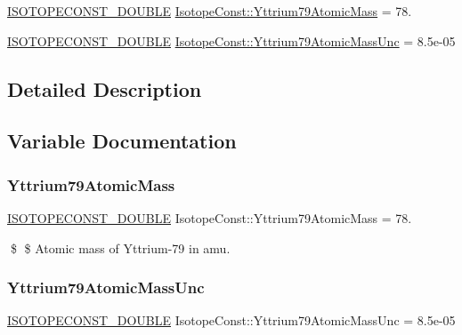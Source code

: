\begin{DoxyCompactItemize}
\item 
\mbox{\hyperlink{group___isotope_const-_macros_ga8f45a7272ce02c0b4c65c44636ed719a}{I\+S\+O\+T\+O\+P\+E\+C\+O\+N\+S\+T\+\_\+\+D\+O\+U\+B\+LE}} \mbox{\hyperlink{group___isotope_const-_yttrium-_y79_ga526811a3c3e331fab478a821fc5aa2d4}{Isotope\+Const\+::\+Yttrium79\+Atomic\+Mass}} = 78.
\item 
\mbox{\hyperlink{group___isotope_const-_macros_ga8f45a7272ce02c0b4c65c44636ed719a}{I\+S\+O\+T\+O\+P\+E\+C\+O\+N\+S\+T\+\_\+\+D\+O\+U\+B\+LE}} \mbox{\hyperlink{group___isotope_const-_yttrium-_y79_gaa7350f475f33f861ac5c93c0d71fae8b}{Isotope\+Const\+::\+Yttrium79\+Atomic\+Mass\+Unc}} = 8.\+5e-\/05
\end{DoxyCompactItemize}


\subsection{Detailed Description}


\subsection{Variable Documentation}
\mbox{\label{group___isotope_const-_yttrium-_y79_ga526811a3c3e331fab478a821fc5aa2d4}} 
\subsubsection{\texorpdfstring{Yttrium79\+Atomic\+Mass}{Yttrium79AtomicMass}}
{\footnotesize\ttfamily \mbox{\hyperlink{group___isotope_const-_macros_ga8f45a7272ce02c0b4c65c44636ed719a}{I\+S\+O\+T\+O\+P\+E\+C\+O\+N\+S\+T\+\_\+\+D\+O\+U\+B\+LE}} Isotope\+Const\+::\+Yttrium79\+Atomic\+Mass = 78.}

\$ \$ Atomic mass of Yttrium-\/79 in amu. \mbox{\label{group___isotope_const-_yttrium-_y79_gaa7350f475f33f861ac5c93c0d71fae8b}} 
\subsubsection{\texorpdfstring{Yttrium79\+Atomic\+Mass\+Unc}{Yttrium79AtomicMassUnc}}
{\footnotesize\ttfamily \mbox{\hyperlink{group___isotope_const-_macros_ga8f45a7272ce02c0b4c65c44636ed719a}{I\+S\+O\+T\+O\+P\+E\+C\+O\+N\+S\+T\+\_\+\+D\+O\+U\+B\+LE}} Isotope\+Const\+::\+Yttrium79\+Atomic\+Mass\+Unc = 8.\+5e-\/05}

